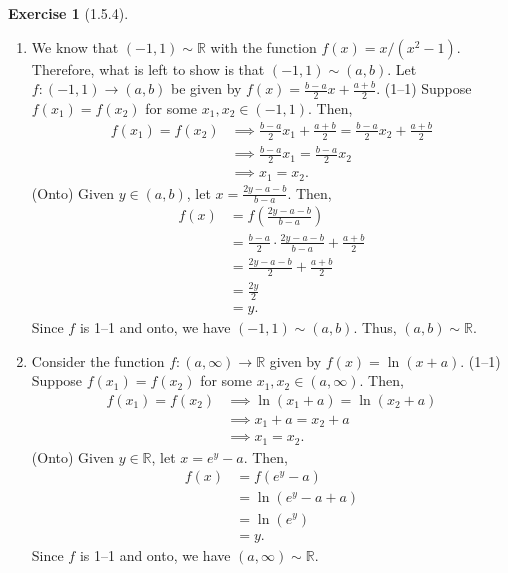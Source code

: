 \documentclass{amsart}
\theoremstyle{definition}
\newtheorem{exercise}{Exercise}
\newcommand{\R}{\mathbb{R}}
\begin{document}
\begin{exercise}[1.5.4]
  \begin{enumerate}[label={(\alph*)}]
    \item We know that $(-1, 1) \sim \R$ with the function $f(x) = x / (x^2 -
      1)$. Therefore, what is left to show is that $(-1, 1) \sim (a, b)$. Let $f
      : (-1, 1) \rightarrow (a, b)$ be given by $f(x) = \frac{b - a}{2} x +
      \frac{a + b}{2}$. (1--1) Suppose $f(x_1) = f(x_2)$ for some $x_1, x_2
      \in (-1, 1)$. Then,
      \begin{align*}
        f(x_1) = f(x_2) &\implies \frac{b - a}{2} x_1 + \frac{a + b}{2} =
        \frac{b - a}{2} x_2 + \frac{a + b}{2} \\
        &\implies \frac{b - a}{2} x_1 = \frac{b - a}{2} x_2 \\
        &\implies x_1 = x_2.
      \end{align*}
      (Onto) Given $y \in (a, b)$, let $x = \frac{2y - a - b}{b - a}$. Then,
      \begin{align*}
        f(x) &= f\left(\frac{2y - a - b}{b - a}\right) \\
        &= \frac{b - a}{2} \cdot \frac{2y - a - b}{b - a} + \frac{a + b}{2} \\
        &= \frac{2y - a - b}{2} + \frac{a + b}{2} \\
        &= \frac{2y}{2} \\
        &= y.
      \end{align*}
      Since $f$ is 1--1 and onto, we have $(-1, 1) \sim (a, b)$. Thus, $(a, b)
      \sim \R$.
    \item Consider the function $f : (a, \infty) \rightarrow \R$ given by $f(x)
      = \ln(x + a)$. (1--1) Suppose $f(x_1) = f(x_2)$ for some $x_1, x_2 \in (a,
      \infty)$. Then,
      \begin{align*}
        f(x_1) = f(x_2) &\implies \ln(x_1 + a) = \ln(x_2 + a) \\
        &\implies x_1 + a = x_2 + a \\
        &\implies x_1 = x_2.
      \end{align*}
      (Onto) Given $y \in \R$, let $x = e^y - a$. Then,
      \begin{align*}
        f(x) &= f(e^y - a) \\
        &= \ln(e^y - a + a) \\
        &= \ln(e^y) \\
        &= y.
      \end{align*}
      Since $f$ is 1--1 and onto, we have $(a, \infty) \sim \R$.

\end{enumerate}
\end{exercise}
\end{document}
